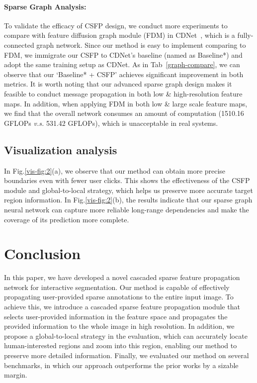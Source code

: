 \documentclass{bmvc2k}
\begin{document}
\paragraph{\textbf{Sparse Graph Analysis:}}
To validate the efficacy of CSFP design, we conduct more experiments to compare with feature diffusion graph module (FDM) in CDNet~\cite{chen2021conditional}, which is a fully-connected graph network. 
Since our method is easy to implement comparing to FDM, we immigrate our CSFP to CDNet’s baseline (named as Baseline*) and adopt the same training setup as CDNet. As in Tab~\ref{graph-compare}, we can observe that our `Baseline* + CSFP' achieves significant improvement in both metrics. It is worth noting that our advanced sparse graph design makes it feasible to conduct message propagation in both low \& high-resolution feature maps. 
In addition, when applying FDM in both low \& large scale feature maps, we find that the overall network consumes an amount of computation (1510.16 GFLOPs \textit{v.s.} 531.42 GFLOPs), which is unacceptable in real systems.







\vspace{-2mm}
\subsection{\textbf{Visualization analysis}}
\vspace{-1mm}
In Fig.\ref{vis-fig:2}(a), we observe that our method can obtain more precise boundaries even with fewer user clicks. This shows the effectiveness of the CSFP module and global-to-local strategy, which helps us preserve more accurate target region information. In Fig.\ref{vis-fig:2}(b), the results indicate that our sparse graph neural network can capture more reliable long-range dependencies and make the coverage of its prediction more complete. 





 \section{Conclusion}
In this paper, we have developed a novel cascaded sparse feature propagation network for interactive segmentation. Our method is capable of effectively propagating user-provided sparse annotations to the entire input image. To achieve this, we introduce a cascaded sparse feature propagation module that selects user-provided information in the feature space and propagates the provided information to the whole image in high resolution. In addition, we propose a global-to-local strategy in the evaluation, which can accurately locate human-interested regions and zoom into this region, enabling our method to preserve more detailed information. Finally, we evaluated our method on several benchmarks, in which our approach outperforms the prior works by a sizable margin.
\end{document}
